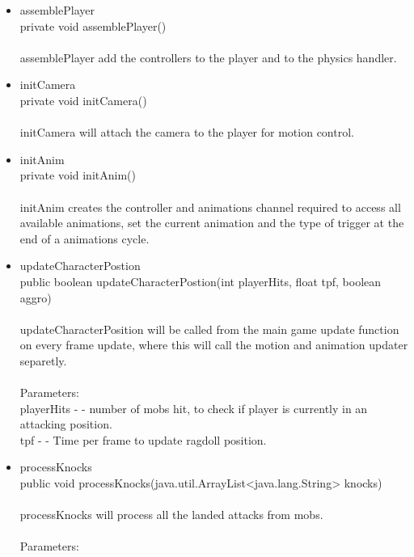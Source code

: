 \documentclass[letterpaper]{article}
\begin{document}
\begin{itemize}
\begin{itemize}
											\item	assemblePlayer \\
													private void assemblePlayer() \\ \\
													assemblePlayer add the controllers to the player and to the physics handler. \\
											\item	initCamera \\
													private void initCamera() \\ \\
													initCamera will attach the camera to the player for motion control. \\
											\item	initAnim \\
													private void initAnim() \\ \\
													initAnim creates the controller and animations channel required to access all available animations, set the current animation and the type of trigger at the end of a animations cycle.
											\item	updateCharacterPostion \\
													public boolean updateCharacterPostion(int playerHits,
													                             float tpf,
													                             boolean aggro) \\ \\
													updateCharacterPosition will be called from the main game update function on every frame update, where this will call the motion and animation updater separetly. \\ \\
													Parameters: \\
													playerHits - - number of mobs hit, to check if player is currently in an attacking position. \\
													tpf - - Time per frame to update ragdoll position. \\
											\item	processKnocks \\
													public void processKnocks(java.util.ArrayList<java.lang.String> knocks) \\ \\
													processKnocks will process all the landed attacks from mobs. \\ \\
													Parameters: \\

\end{itemize}
\end{itemize}
\end{document}
